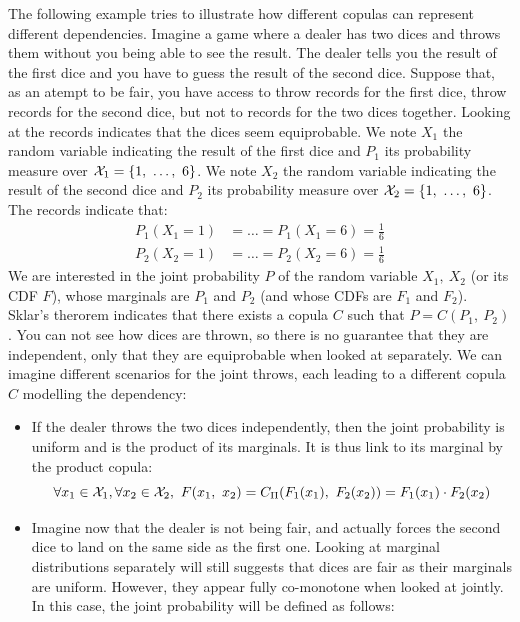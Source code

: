 \begin{example}
	The following example tries to illustrate how different copulas can represent different dependencies. Imagine a game where a dealer has two dices and throws them without you being able to see the result. The dealer tells you the result of the first dice and you have to guess the result of the second dice. Suppose that, as an atempt to be fair, you have access to throw records for the first dice, throw records for the second dice, but not to records for the two dices together. Looking at the records indicates that the dices seem equiprobable. We note \(X_1\) the random variable indicating the result of the first dice and \(P_1\) its probability measure over \( {\mathcal{X}}_1 = \{1,~\dots,~6\} \). We note \(X_2\) the random variable indicating the result of the second dice and \(P_2\) its probability measure over \( {\mathcal{X}}_2 = \{1,~\dots,~6\} \).  The records indicate that:
	\begin{align*}
		P_1(X_1=1)&=\dots=P_1(X_1=6)=\frac{1}{6}\\
		P_2(X_2=1)&=\dots=P_2(X_2=6)=\frac{1}{6}
	\end{align*}
	We are interested in the joint probability \(P\) of the random variable \(X_1,~X_2\) (or its CDF \(  F \)), whose marginals are \(P_1\) and \(P_2\) (and whose CDFs are \( F_1\) and \( F_2 \)). Sklar's therorem indicates that there exists a copula $C$ such that \(P=C(P_1,~P_2)\). You can not see how dices are thrown, so there is no guarantee that they are independent, only that they are equiprobable when looked at separately. We can imagine different scenarios for the joint throws, each leading to a different copula $C$ modelling the dependency:
	\begin{itemize}
		\item If the dealer throws the two dices independently, then the joint probability is uniform and is the product of its marginals. It is thus link to its marginal by the product copula:
		\begin{equation*}
			\forall x_1\in{\mathcal{X}}_1, \forall x_2 \in {\mathcal{X}}_2, ~F(x_1,~x_2)=C_\Pi(F_1(x_1),~F_2(x_2))=F_1(x_1)\cdot F_2(x_2)
		\end{equation*}
		\item Imagine now that the dealer is not being fair, and actually forces the second dice to land on the same side as the first one. Looking at marginal distributions separately will still suggests that dices are fair as their marginals are uniform. However, they appear fully co-monotone when looked at jointly. In this case, the joint probability will be defined as follows: 

\end{itemize}
\end{example}
